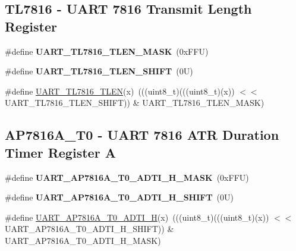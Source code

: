 \subsection*{T\+L7816 -\/ U\+A\+RT 7816 Transmit Length Register}
\begin{DoxyCompactItemize}
\item 
\mbox{\label{group___u_a_r_t___register___masks_ga000fb6043015c4cb478d32febfb4a913}} 
\#define {\bfseries U\+A\+R\+T\+\_\+\+T\+L7816\+\_\+\+T\+L\+E\+N\+\_\+\+M\+A\+SK}~(0x\+F\+F\+U)
\item 
\mbox{\label{group___u_a_r_t___register___masks_gaafcee96c5728fbbbc56c3b2ea55bd753}} 
\#define {\bfseries U\+A\+R\+T\+\_\+\+T\+L7816\+\_\+\+T\+L\+E\+N\+\_\+\+S\+H\+I\+FT}~(0\+U)
\item 
\#define \mbox{\hyperlink{group___u_a_r_t___register___masks_gaf537ccbe6ddd913ae8f3a988393519e4}{U\+A\+R\+T\+\_\+\+T\+L7816\+\_\+\+T\+L\+EN}}(x)~(((uint8\+\_\+t)(((uint8\+\_\+t)(x)) $<$$<$ U\+A\+R\+T\+\_\+\+T\+L7816\+\_\+\+T\+L\+E\+N\+\_\+\+S\+H\+I\+FT)) \& U\+A\+R\+T\+\_\+\+T\+L7816\+\_\+\+T\+L\+E\+N\+\_\+\+M\+A\+SK)
\end{DoxyCompactItemize}
\subsection*{A\+P7816\+A\+\_\+\+T0 -\/ U\+A\+RT 7816 A\+TR Duration Timer Register A}
\begin{DoxyCompactItemize}
\item 
\mbox{\label{group___u_a_r_t___register___masks_gaf6d47c14433fd255931fd79234276f6e}} 
\#define {\bfseries U\+A\+R\+T\+\_\+\+A\+P7816\+A\+\_\+\+T0\+\_\+\+A\+D\+T\+I\+\_\+\+H\+\_\+\+M\+A\+SK}~(0x\+F\+F\+U)
\item 
\mbox{\label{group___u_a_r_t___register___masks_gad419b5bbcf7d2ac90db13170723f3090}} 
\#define {\bfseries U\+A\+R\+T\+\_\+\+A\+P7816\+A\+\_\+\+T0\+\_\+\+A\+D\+T\+I\+\_\+\+H\+\_\+\+S\+H\+I\+FT}~(0\+U)
\item 
\#define \mbox{\hyperlink{group___u_a_r_t___register___masks_ga43e9b61e16a5f00b4c010750f710a9f5}{U\+A\+R\+T\+\_\+\+A\+P7816\+A\+\_\+\+T0\+\_\+\+A\+D\+T\+I\+\_\+H}}(x)~(((uint8\+\_\+t)(((uint8\+\_\+t)(x)) $<$$<$ U\+A\+R\+T\+\_\+\+A\+P7816\+A\+\_\+\+T0\+\_\+\+A\+D\+T\+I\+\_\+\+H\+\_\+\+S\+H\+I\+FT)) \& U\+A\+R\+T\+\_\+\+A\+P7816\+A\+\_\+\+T0\+\_\+\+A\+D\+T\+I\+\_\+\+H\+\_\+\+M\+A\+SK)
\end{DoxyCompactItemize}
